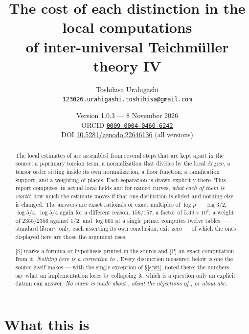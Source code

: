 \documentclass[11pt]{article}
\title{The cost of each distinction in the local computations\\
of inter-universal Teichm\"uller theory IV}
\author{Toshihisa Urahigashi\\
\small\texttt{123026.urahigashi.toshihisa@gmail.com}}
\date{Version 1.0.3 --- 8 November 2026\\[3pt]
\small ORCID \href{https://orcid.org/0009-0004-0460-6242}{\texttt{0009-0004-0460-6242}}\\[3pt]
\small DOI \href{https://doi.org/10.5281/zenodo.22646136}{10.5281/zenodo.22646136} (all versions)}
\theoremstyle{plain}
\theoremstyle{definition}
\begin{document}
\maketitle

\begin{abstract}
The local estimates of \cite[\S1]{IUT4} are assembled from several steps that are kept
apart in the source: a $p$-primary torsion term, a normalization that divides by the
local degree, a tensor order sitting inside its own normalization, a floor function, a
ramification support, and a weighting of places.  Each separation is drawn explicitly
there.  This report computes, in actual local fields and for named curves, \emph{what
each of them is worth}: how much the estimate moves if that one distinction is elided
and nothing else is changed.  The answers are exact rationals or exact multiples of
$\log p$ --- $\log3/2$, $\log5/4$, $\log5/4$ again for a different reason, $156/157$,
a factor of $5.49\times10^{4}$, a weight of $2355/2356$ against $1/2$, and $\log661$ at
a single prime.   computes twelve tables --- standard library
only, each asserting its own conclusion, exit zero --- of which the ones displayed here
are those the argument uses.

\textup{[S]} marks a formula or hypothesis printed in the source and \textup{[P]} an
exact computation from it.  \emph{Nothing here is a correction to \cite{IUT4}.} Every
distinction measured below is one the source itself makes --- with the single
exception of \S\ref{s:wt}, noted there; the numbers say what an
implementation loses by collapsing it, which is a question only an explicit datum can
answer.  \emph{No claim is made about \cite[Cor.~3.12]{IUT3}, about the objections of
\cite{SS}, or about $abc$.}
\end{abstract}

\section{What this is}\label{s:what}
\end{document}
